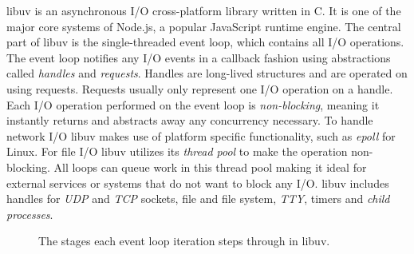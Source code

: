 libuv is an asynchronous I/O cross-platform library written in C. It is one of
the major core systems of Node.js, a popular JavaScript runtime engine. The
central part of libuv is the single-threaded event loop, which contains all I/O
operations. The event loop notifies any I/O events in a callback fashion using
abstractions called \textit{handles} and \textit{requests}. Handles are
long-lived structures and are operated on using requests. Requests usually only
represent one I/O operation on a handle. Each I/O operation performed on the
event loop is \textit{non-blocking}, meaning it instantly returns and abstracts
away any concurrency necessary. To handle network I/O libuv makes use of
platform specific functionality, such as \textit{epoll} for Linux. For file I/O
libuv utilizes its \textit{thread pool} to make the operation non-blocking.
All loops can queue work in this thread pool making it ideal for external
services or systems that do not want to block any I/O. libuv includes handles
for \textit{UDP} and \textit{TCP} sockets, file and file system, \textit{TTY},
timers and \textit{child processes}. \cite{libuv-docs}

\begin{figure}[h!]
\centering

    \caption[The libuv event loop.]{The stages each event loop iteration steps
    through in libuv.}

    \label{fig:loop_iteration}
\end{figure}

